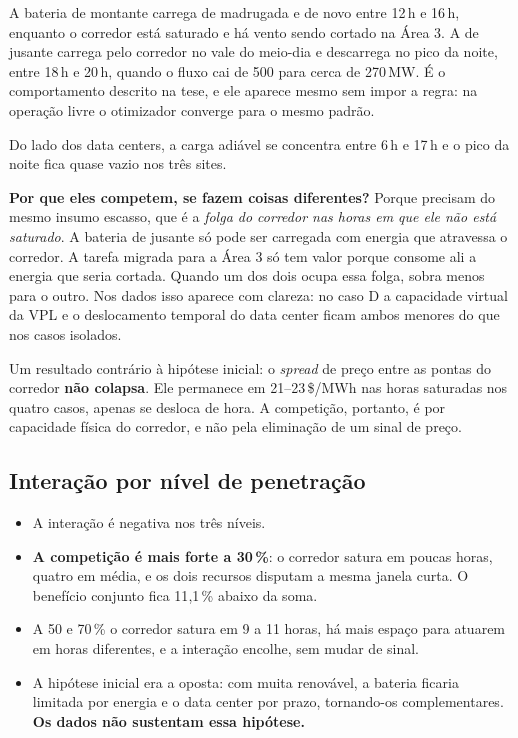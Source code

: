 \documentclass[11pt,a4paper]{article}
\begin{document}
A bateria de montante carrega de madrugada e de novo entre 12\,h e 16\,h, enquanto o corredor está
saturado e há vento sendo cortado na Área 3. A de jusante carrega pelo corredor no vale do meio-dia e
descarrega no pico da noite, entre 18\,h e 20\,h, quando o fluxo cai de 500 para cerca de 270\,MW. É o
comportamento descrito na tese, e ele aparece mesmo sem impor a regra: na operação livre o otimizador
converge para o mesmo padrão.

Do lado dos data centers, a carga adiável se concentra entre 6\,h e 17\,h e o pico da noite fica quase
vazio nos três sites.

\textbf{Por que eles competem, se fazem coisas diferentes?} Porque precisam do mesmo insumo escasso, que
é a \emph{folga do corredor nas horas em que ele não está saturado}. A bateria de jusante só pode ser
carregada com energia que atravessa o corredor. A tarefa migrada para a Área 3 só tem valor porque consome
ali a energia que seria cortada. Quando um dos dois ocupa essa folga, sobra menos para o outro. Nos dados
isso aparece com clareza: no caso D a capacidade virtual da VPL e o deslocamento temporal do data center
ficam ambos menores do que nos casos isolados.

Um resultado contrário à hipótese inicial: o \emph{spread} de preço entre as pontas do corredor
\textbf{não colapsa}. Ele permanece em 21--23\,\$/MWh nas horas saturadas nos quatro casos, apenas se
desloca de hora. A competição, portanto, é por capacidade física do corredor, e não pela eliminação de um
sinal de preço.

\subsection{Interação por nível de penetração}

\begin{table}[htbp]
\centering\small
\caption{Valor marginal e interação por nível de penetração, médias dos quatro dias (k\$/dia). A coluna
``ruído'' é a soma dos gaps absolutos dos quatro casos, o limite abaixo do qual $I$ não se distingue da
tolerância do solver.}
\tabpenetracao
\end{table}

\begin{itemize}
\item A interação é negativa nos três níveis.
\item \textbf{A competição é mais forte a 30\,\%}: o corredor satura em poucas horas, quatro em média, e
os dois recursos disputam a mesma janela curta. O benefício conjunto fica 11{,}1\,\% abaixo da soma.
\item A 50 e 70\,\% o corredor satura em 9 a 11 horas, há mais espaço para atuarem em horas diferentes, e
a interação encolhe, sem mudar de sinal.
\item A hipótese inicial era a oposta: com muita renovável, a bateria ficaria limitada por energia e o
data center por prazo, tornando-os complementares. \textbf{Os dados não sustentam essa hipótese.}
\end{itemize}
\end{document}
